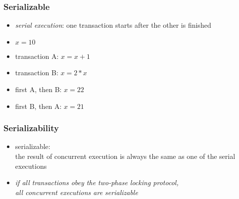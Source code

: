 \documentclass[dvipsnames]{beamer}
\theoremstyle{plain}
\begin{document}
\begin{frame}
  \frametitle{Serializable}

  \begin{itemize}
    \item \emph{serial execution}: one transaction starts after the other is
      finished
  \end{itemize}

  \pause
  \begin{example}
    \begin{itemize}
      \item $x=10$
      \item transaction A: $x=x+1$
      \item transaction B: $x=2*x$

      \pause
      \medskip
      \item first A, then B: $x=22$
      \item first B, then A: $x=21$
    \end{itemize}
  \end{example}
\end{frame}

\begin{frame}
  \frametitle{Serializability}

  \begin{itemize}
    \item \alert{serializable}:\\
      the result of concurrent execution is always the same as one of the
      serial executions

    \pause
    \item \emph{if all transactions obey the two-phase locking protocol,\\
      all concurrent executions are serializable}
  \end{itemize}
\end{frame}
\end{document}

